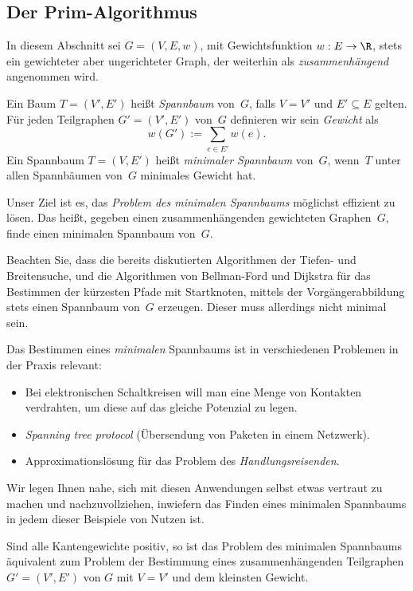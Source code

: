 \subsection{Der Prim-Algorithmus}

In diesem Abschnitt sei $G=(V,E,w)$, mit Gewichtsfunktion $w : E \to \R$, stets ein gewichteter aber ungerichteter Graph, der weiterhin als \emph{zusammenhängend} angenommen wird.

Ein Baum $T=(V',E')$ heißt \emph{Spannbaum} von~$G$, falls $V=V'$ und $E' \subseteq E$ gelten.
Für jeden Teilgraphen $G' = (V', E')$ von~$G$ definieren wir sein \emph{Gewicht} als
\[
w(G') := \sum_{e \in E'} w(e).
\]
%
Ein Spannbaum $T=(V,E')$ heißt \emph{minimaler Spannbaum} von~$G$, wenn~$T$ unter allen Spannbäumen von~$G$ minimales Gewicht hat.

Unser Ziel ist es, das \emph{Problem des minimalen Spannbaums} möglichst effizient zu lösen.
Das heißt, gegeben einen zusammenhängenden gewichteten Graphen~$G$, finde einen minimalen Spannbaum von~$G$.

Beachten Sie, dass die bereits diskutierten Algorithmen der Tiefen- und Breitensuche, und die Algorithmen von Bellman-Ford und Dijkstra für das Bestimmen der kürzesten Pfade mit Startknoten, mittels der Vorgängerabbildung stets einen Spannbaum von~$G$ erzeugen.
Dieser muss allerdings nicht minimal sein.

Das Bestimmen eines \emph{minimalen} Spannbaums ist in verschiedenen Problemen in der Praxis relevant:
%
\begin{itemize}
 \item Bei elektronischen Schaltkreisen will man eine Menge von Kontakten verdrahten, um diese auf das gleiche Potenzial zu legen.
 \item \emph{Spanning tree protocol} (Übersendung von Paketen in einem Netzwerk).
 \item Approximationslösung für das Problem des \emph{Handlungsreisenden}.
\end{itemize}

Wir legen Ihnen nahe, sich mit diesen Anwendungen selbst etwas vertraut zu machen und nachzuvollziehen, inwiefern das Finden eines minimalen Spannbaums in jedem dieser Beispiele von Nutzen ist.

\begin{beobachtung}
Sind alle Kantengewichte positiv, so ist das Problem des minimalen Spannbaums äquivalent zum Problem der Bestimmung eines zusammenhängenden Teilgraphen $G'= (V',E')$ von $G$ mit $V=V'$ und dem kleinsten Gewicht.
\end{beobachtung}

